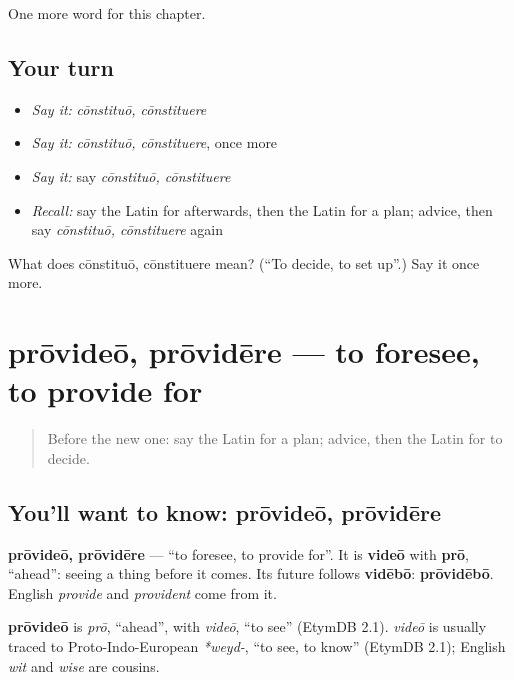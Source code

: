 \begin{grammarlens}[title={What you've built}]
One more word for this chapter.
\end{grammarlens}

\subsection*{Your turn}
\begin{itemize}
\raggedright
  \item \emph{Say it:} \emph{cōnstituō, cōnstituere}
  \item \emph{Say it:} \emph{cōnstituō, cōnstituere}, once more
  \item \emph{Say it:} say \emph{cōnstituō, cōnstituere}
  \item \emph{Recall:} say the Latin for afterwards, then the Latin for a plan; advice, then say \emph{cōnstituō, cōnstituere} again
\end{itemize}

\begin{tcolorbox}[breakable,colback=teal!4,colframe=teal!35!black,title={Before you move on}]
What does cōnstituō, cōnstituere mean? (\textquotedblleft{}To decide, to set up\textquotedblright{}.) Say it once more.
\end{tcolorbox}
\section[prōvideō, prōvidēre]{prōvideō, prōvidēre — to foresee, to provide for}

\label{lesson:LA-C163-provideo}



\begin{quote}
Before the new one: say the Latin for a plan; advice, then the Latin for to decide.
\end{quote}

\subsection*{You'll want to know: prōvideō, prōvidēre}
\textbf{prōvideō, prōvidēre} — \textquotedblleft{}to foresee, to provide for\textquotedblright{}. It is \textbf{videō} with \textbf{prō}, \textquotedblleft{}ahead\textquotedblright{}: seeing a thing before it comes. Its future follows \textbf{vidēbō}: \textbf{prōvidēbō}. English \emph{provide} and \emph{provident} come from it.

\begin{cousinweb}
\textbf{prōvideō} is \emph{prō}, \textquotedblleft{}ahead\textquotedblright{}, with \emph{videō}, \textquotedblleft{}to see\textquotedblright{} (EtymDB 2.1). \emph{videō} is usually traced to Proto-Indo-European \emph{*weyd-}, \textquotedblleft{}to see, to know\textquotedblright{} (EtymDB 2.1); English \emph{wit} and \emph{wise} are cousins.
\end{cousinweb}

